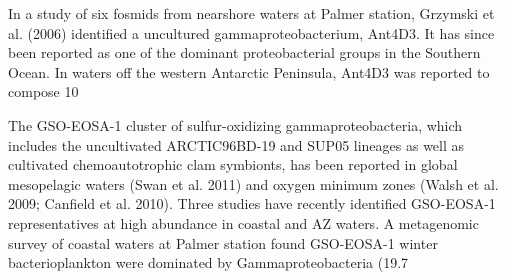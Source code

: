 
In a study of six fosmids from nearshore waters at Palmer station, Grzymski et al. (2006) identified a uncultured gammaproteobacterium, Ant4D3. It has since been reported as one of the dominant proteobacterial groups in the Southern Ocean. In waters off the western Antarctic Peninsula, Ant4D3 was reported to compose 10%


The GSO-EOSA-1 cluster of sulfur-oxidizing gammaproteobacteria, which includes the uncultivated ARCTIC96BD-19 and SUP05 lineages as well as cultivated chemoautotrophic clam symbionts, has been reported in global mesopelagic waters (Swan et al. 2011) and oxygen minimum zones (Walsh et al. 2009; Canfield et al. 2010). Three studies have recently identified GSO-EOSA-1 representatives at high abundance in coastal and AZ waters. A metagenomic survey of coastal waters at Palmer station found GSO-EOSA-1
winter bacterioplankton were dominated by Gammaproteobacteria (19.7%

